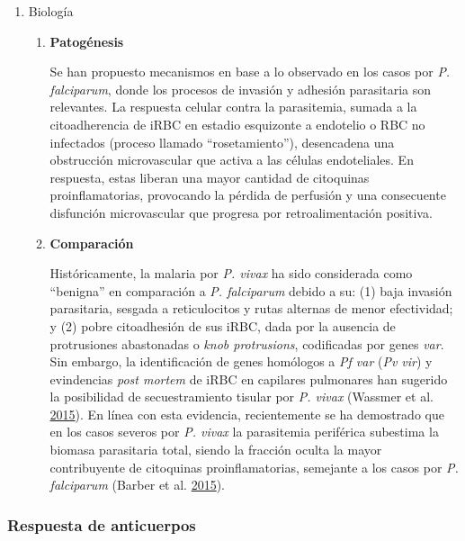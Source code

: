 \documentclass[a4paper]{article}
\begin{document}
\begin{enumerate}
\def\labelenumi{\alph{enumi}.}
\setcounter{enumi}{2}
\item
  Biología

  \begin{enumerate}
  \def\labelenumii{\roman{enumii}.}
  \item
    \textbf{Patogénesis}

    Se han propuesto mecanismos en base a lo observado en los casos por
    \emph{P. falciparum}, donde los procesos de invasión y adhesión
    parasitaria son relevantes. La respuesta celular contra la
    parasitemia, sumada a la citoadherencia de iRBC en estadio
    esquizonte a endotelio o RBC no infectados (proceso llamado
    ``rosetamiento''), desencadena una obstrucción microvascular que
    activa a las células endoteliales. En respuesta, estas liberan una
    mayor cantidad de citoquinas proinflamatorias, provocando la pérdida
    de perfusión y una consecuente disfunción microvascular que progresa
    por retroalimentación positiva.
  \item
    \textbf{Comparación}

    Históricamente, la malaria por \emph{P. vivax} ha sido considerada
    como ``benigna'' en comparación a \emph{P. falciparum} debido a su:
    (1) baja invasión parasitaria, sesgada a reticulocitos y rutas
    alternas de menor efectividad; y (2) pobre citoadhesión de sus iRBC,
    dada por la ausencia de protrusiones abastonadas o \emph{knob
    protrusions}, codificadas por genes \emph{var}. Sin embargo, la
    identificación de genes homólogos a \emph{Pf var} (\emph{Pv vir}) y
    evindencias \emph{post mortem} de iRBC en capilares pulmonares han
    sugerido la posibilidad de secuestramiento tisular por \emph{P.
    vivax} (Wassmer et al. \protect\hyperlink{ref-wassmer2015}{2015}).
    En línea con esta evidencia, recientemente se ha demostrado que en
    los casos severos por \emph{P. vivax} la parasitemia periférica
    subestima la biomasa parasitaria total, siendo la fracción oculta la
    mayor contribuyente de citoquinas proinflamatorias, semejante a los
    casos por \emph{P. falciparum} (Barber et al.
    \protect\hyperlink{ref-barber2015}{2015}). 
  \end{enumerate}
\end{enumerate}

\subsubsection{Respuesta de anticuerpos}\label{respuesta-de-anticuerpos}
\end{document}
